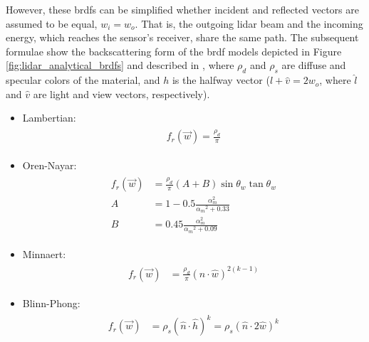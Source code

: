 However, these \acrshort{brdf}s can be simplified whether incident and reflected vectors are assumed to be equal, $w_{i} = w_{o}$. That is, the outgoing \acrshort{lidar} beam and the incoming energy, which reaches the sensor's receiver, share the same path. The subsequent formulae show the backscattering form of the \acrshort{brdf} models depicted in Figure \ref{fig:lidar_analytical_brdfs} and described in \cite{montes_soldado_overview_2012, guarnera_brdf_2016}, where $\rho_{d}$ and $\rho_{s}$ are diffuse and specular colors of the material, and $h$ is the halfway vector ($\hat{l} + \hat{v} = 2w_{o}$, where $\hat{l}$ and $\hat{v}$ are light and view vectors, respectively).
\begin{itemize}
    \item Lambertian: 
    \begin{gather}
        \label{eq:lambert_brdf}
        \begin{aligned}
            f_{r}(\vec{w}) = \frac{\rho_{d}}{\pi}
        \end{aligned}
    \end{gather}
    \item Oren-Nayar: 
    \begin{gather}
        \label{eq:oren_nayar_brdf}
        \begin{aligned}
            f_{r}(\vec{w}) &= \frac{\rho_{d}}{\pi}(A + B)\sin{\theta_{w}} \tan{\theta_{w}}\\
            A &= 1 - 0.5 \frac{{\alpha_{m}^{2}}}{{\alpha_{m}}^2 + 0.33}\\
            B &= 0.45 \frac{{\alpha_{m}^{2}}}{{\alpha_{m}}^2 + 0.09}
        \end{aligned}
    \end{gather}
    \item Minnaert:
    \begin{gather}
        \label{eq:minnaert_brdf}
        \begin{aligned}
            f_{r}(\vec{w}) &= \frac{\rho_{d}}{\pi}(\hat{n} \cdot \hat{w})^{2(k-1)}
        \end{aligned}
    \end{gather}
    \item Blinn-Phong: 
    \begin{gather}
        \label{eq:blinn_phong_brdf}
        \begin{aligned}
            f_{r}(\vec{w}) &= \rho_{s}(\hat{n} \cdot \hat{h})^{k} = \rho_{s}(\hat{n} \cdot 2\hat{w})^{k}
        \end{aligned}
    \end{gather}

\end{itemize}
